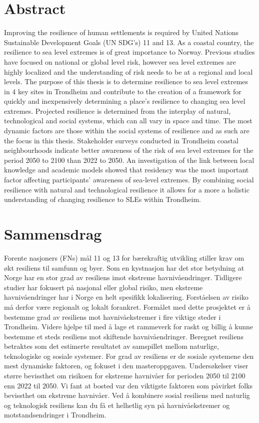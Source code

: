 


\section{Abstract}

Improving the resilience of human settlements is required by United Nations Sustainable Development Goals (UN SDG's) 11 and 13. As a coastal country, the resilience to sea level extremes is of great importance to Norway. Previous studies have focused on national or global level risk, however sea level extremes are highly localized  and the understanding of risk needs to be at a regional and local levels. The purpose of this thesis is to determine resilience to sea level extremes in 4 key sites in Trondheim and contribute to the creation of a framework for quickly and inexpensively determining a place's resilience to changing sea level extremes. Projected resilience is determined from the interplay of natural, technological and social systems, which can all vary in space and time. The most dynamic factors are those within the social systems of resilience and as such are the focus in this thesis. Stakeholder surveys conducted in Trondheim coastal neighbourhoods indicate better awareness of the risk of sea level extremes for the period 2050 to 2100 than 2022 to 2050. An  investigation of the link between local knowledge and academic models showed that residency was the most important factor affecting participants' awareness of sea-level extremes.  By combining social resilience with natural and technological resilience it allows for a more a holistic understanding of changing resilience to SLEs within Trondheim.
   

\newpage

\section{Sammensdrag}
Forente nasjoners (FNs) mål 11 og 13 for bærekraftig utvikling stiller krav om økt resiliens til samfunn og byer. Som en kystnasjon har det stor betydning at Norge har en stor grad av resiliens imot ekstreme havnivåendringer. Tidligere studier har fokusert på nasjonal eller global risiko, men ekstreme havnivåendringer har i Norge en helt spesifikk lokalisering. Forståelsen av risiko må derfor være regionalt og lokalt forankret. Formålet med dette prosjektet er å bestemme grad av resiliens mot havnivåekstremer i fire viktige steder i Trondheim. Videre hjelpe til med å lage et rammeverk for raskt og billig å kunne bestemme et steds resiliens mot skiftende havnivåendringer. Beregnet resiliens betraktes som det estimerte resultatet av samspillet mellom naturlige, teknologiske og sosiale systemer. For grad av resiliens er de sosiale systemene den mest dynamiske faktoren, og fokuset i den masteroppgaven. Undersøkelser viser større bevissthet om risikoen for ekstreme havnivåer for perioden 2050 til 2100 enn 2022 til 2050. Vi fant at bosted var den viktigste faktoren som påvirket folks bevissthet om ekstreme havnivåer. Ved å kombinere sosial resiliens med naturlig og teknologisk resiliens kan du få et helhetlig syn på havnivåekstremer og motstandsendringer i Trondheim.